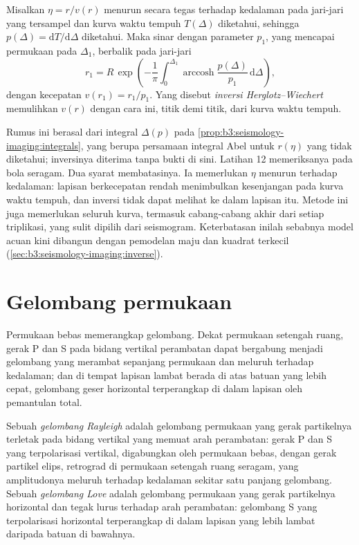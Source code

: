 \begin{proposition}\label{prop:b3:seismology-imaging:herglotz}
Misalkan $\eta = r/v(r)$ menurun secara tegas terhadap kedalaman pada jari-jari yang tersampel
dan kurva waktu tempuh $T(\Delta)$ diketahui, sehingga $p(\Delta) =
\mathrm dT/\mathrm d\Delta$ diketahui. Maka sinar dengan parameter $p_1$, yang
mencapai permukaan pada $\Delta_1$, berbalik pada jari-jari
\[
  r_1 = R\,\exp\!\left(-\frac1\pi\int_0^{\Delta_1}
  \operatorname{arccosh}\frac{p(\Delta)}{p_1}\,\mathrm d\Delta\right),
\]
dengan kecepatan $v(r_1) = r_1/p_1$. Yang disebut
\emph{inversi Herglotz--Wiechert} memulihkan $v(r)$ dengan cara ini,
titik demi titik, dari kurva waktu tempuh.
\end{proposition}
\admitted

Rumus ini berasal dari integral $\Delta(p)$ pada
\cref{prop:b3:seismology-imaging:integrals}, yang berupa persamaan integral Abel
untuk $r(\eta)$ yang tidak diketahui; inversinya diterima tanpa bukti di sini.
Latihan 12 memeriksanya pada bola seragam. Dua syarat membatasinya. Ia memerlukan
$\eta$ menurun terhadap kedalaman: lapisan berkecepatan rendah menimbulkan kesenjangan pada
kurva waktu tempuh, dan inversi tidak dapat melihat ke dalam lapisan itu. Metode ini juga memerlukan
seluruh kurva, termasuk cabang-cabang akhir dari setiap triplikasi, yang
sulit dipilih dari seismogram. Keterbatasan inilah sebabnya model acuan kini
dibangun dengan pemodelan maju dan kuadrat terkecil (\cref{sec:b3:seismology-imaging:inverse}).

\section{Gelombang permukaan}

Permukaan bebas memerangkap gelombang. Dekat permukaan setengah ruang, gerak P dan S
pada bidang vertikal perambatan dapat bergabung menjadi gelombang yang merambat sepanjang
permukaan dan meluruh terhadap kedalaman; dan di tempat lapisan lambat berada di atas batuan yang lebih cepat,
gelombang geser horizontal terperangkap di dalam lapisan oleh pemantulan total.

\begin{definition}\label{def:b3:seismology-imaging:surface-waves}
Sebuah \emph{gelombang Rayleigh} adalah gelombang permukaan yang gerak partikelnya
terletak pada bidang vertikal yang memuat arah perambatan:
gerak P dan S yang terpolarisasi vertikal, digabungkan oleh permukaan bebas, dengan
gerak partikel elips, retrograd di permukaan setengah ruang seragam,
yang amplitudonya meluruh terhadap kedalaman sekitar satu panjang gelombang. Sebuah \emph{gelombang Love}
adalah gelombang permukaan yang gerak partikelnya horizontal
dan tegak lurus terhadap arah perambatan: gelombang S yang terpolarisasi horizontal
terperangkap di dalam lapisan yang lebih lambat daripada batuan di bawahnya.
\end{definition}

